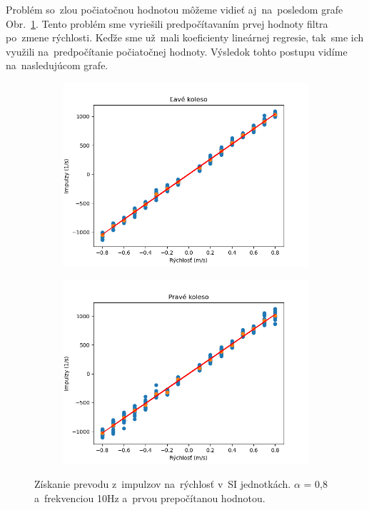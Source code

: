 Problém so~zlou počiatočnou hodnotou môžeme vidieť aj~na~posledom grafe Obr.~\ref{fig:rw_lw_08100_3}. Tento problém sme vyriešili
predpočítavaním prvej hodnoty filtra po~zmene rýchlosti. Keďže sme už~mali koeficienty lineárnej regresie, tak~sme ich využili
na~predpočítanie počiatočnej hodnoty. Výsledok tohto postupu vidíme na~nasledujúcom grafe.

\begin{figure}[!htbp]
	\begin{subfigure}{0.5\textwidth}
		\includegraphics[width=\textwidth]{img/lw_08100_3.png}
	\end{subfigure}
	\hfill
	\begin{subfigure}{0.5\textwidth}
		\includegraphics[width=\textwidth]{img/rw_08100_3.png}
	\end{subfigure}
	\caption{Získanie prevodu z~impulzov na~rýchlosť v~SI jednotkách. $\alpha$ = 0,8 a~frekvenciou 10Hz a~prvou prepočítanou hodnotou.}
	\label{fig:rw_lw_08100_3}
\end{figure}

